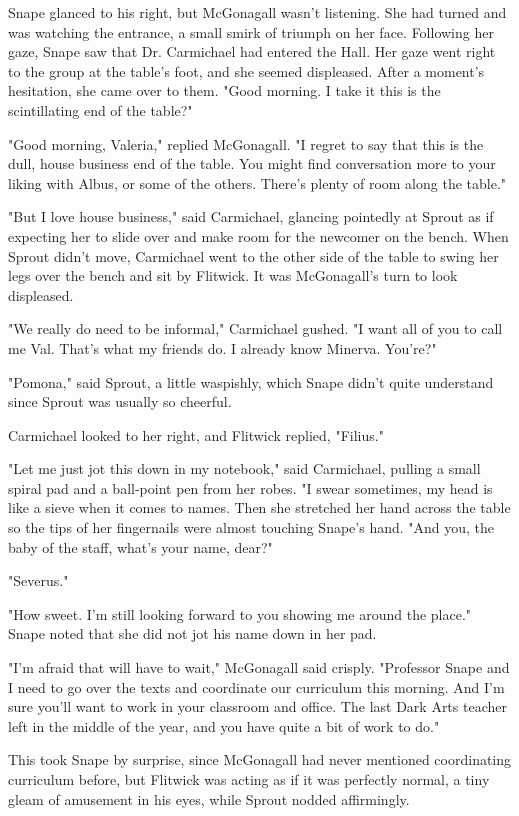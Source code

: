 Snape glanced to his right, but McGonagall wasn't listening. She had turned and was watching the entrance, a small smirk of triumph on her face. Following her gaze, Snape saw that Dr. Carmichael had entered the Hall. Her gaze went right to the group at the table's foot, and she seemed displeased. After a moment's hesitation, she came over to them. "Good morning. I take it this is the scintillating end of the table?"

"Good morning, Valeria," replied McGonagall. "I regret to say that this is the dull, house business end of the table. You might find conversation more to your liking with Albus, or some of the others. There's plenty of room along the table."

"But I love house business," said Carmichael, glancing pointedly at Sprout as if expecting her to slide over and make room for the newcomer on the bench. When Sprout didn't move, Carmichael went to the other side of the table to swing her legs over the bench and sit by Flitwick. It was McGonagall's turn to look displeased.

"We really do need to be informal," Carmichael gushed. "I want all of you to call me Val. That's what my friends do. I already know Minerva. You're{\el}?"

"Pomona," said Sprout, a little waspishly, which Snape didn't quite understand since Sprout was usually so cheerful.

Carmichael looked to her right, and Flitwick replied, "Filius."

"Let me just jot this down in my notebook," said Carmichael, pulling a small spiral pad and a ball-point pen from her robes. "I swear sometimes, my head is like a sieve when it comes to names. Then she stretched her hand across the table so the tips of her fingernails were almost touching Snape's hand. "And you, the baby of the staff, what's your name, dear?"

"Severus."

"How sweet. I'm still looking forward to you showing me around the place." Snape noted that she did not jot his name down in her pad.

"I'm afraid that will have to wait," McGonagall said crisply. "Professor Snape and I need to go over the texts and coordinate our curriculum this morning. And I'm sure you'll want to work in your classroom and office. The last Dark Arts teacher left in the middle of the year, and you have quite a bit of work to do."

This took Snape by surprise, since McGonagall had never mentioned coordinating curriculum before, but Flitwick was acting as if it was perfectly normal, a tiny gleam of amusement in his eyes, while Sprout nodded affirmingly.

